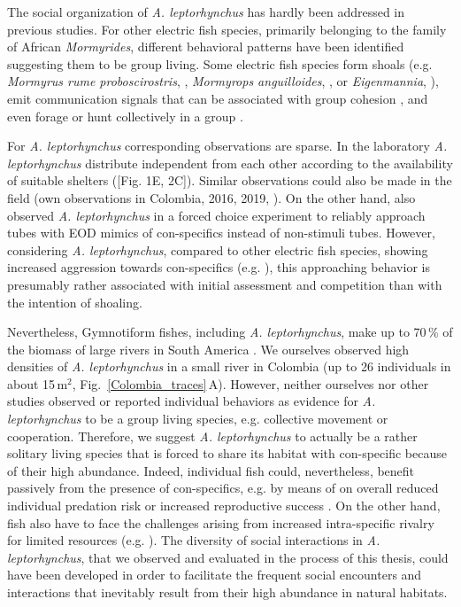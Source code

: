 \documentclass[11pt,pdftex]{article}
\newcommand{\panel}[1]{\textsf{#1}}
\newcommand{\subfref}[2]{\textup{\ref{#1}}\,\panel{#2}}
\newcommand{\fig}{Fig.}
\newcommand{\subfigref}[2]{\fig~\subfref{#1}{#2}}
\newcommand{\note}[2][]{\textcolor{red!80!black}{[\textbf{\ifthenelse{\equal{#1}{}}{}{#1: }}#2]}}
\newcommand{\notetr}[1]{\note[TR]{#1}}
\newcommand{\lepto}{\textit{A. leptorhynchus}}
\newcommand{\Eigenmannia}{\textit{Eigenmannia}}
\begin{document}
The social organization of \lepto{} has hardly been addressed in previous studies. For other electric fish species, primarily belonging to the family of African \textit{Mormyrides}, different behavioral patterns have been identified suggesting them to be group living. Some electric fish species form shoals (e.g. \textit{Mormyrus rume proboscirostris}, \citealp{Worm2021}, \textit{Mormyrops anguilloides}, \citealp{Arnegard2005}, or \Eigenmannia, \citealp{Oestreich2005}), emit communication signals that can be associated with group cohesion \citep{Arnegard2005, Worm2021}, and even forage or hunt collectively in a group \citep{Arnegard2005, Bastos2021}. 

For \lepto{} corresponding observations are sparse. In the laboratory \lepto{} distribute independent from each other according to the availability of suitable shelters (\notetr{Fig. 1E, 2C}). Similar observations could also be made in the field (own observations in Colombia, 2016, 2019, \citealp{Stamper2010}). On the other hand, \citet{Stamper2010} also observed \lepto{} in a forced choice experiment to reliably approach tubes with EOD mimics of con-specifics instead of non-stimuli tubes. However, considering \lepto{}, compared to other electric fish species,  showing increased aggression towards con-specifics (e.g. \citealp{Triefenbach2008}), this approaching behavior is presumably rather associated with initial assessment and competition than with the intention of shoaling. 

Nevertheless, Gymnotiform fishes, including \lepto{}, make up to 70\,\% of the biomass of large rivers in South America \citep{Marrero1991, Cox2004, Crampton2011}. We ourselves observed high densities of \lepto{} in a small river in Colombia (up to 26 individuals in about 15\,m$^2$, \subfigref{Colombia_traces}{A}). However, neither ourselves nor other studies observed or reported individual behaviors as evidence for \lepto{} to be a group living species, e.g. collective movement or cooperation. Therefore, we suggest \lepto{} to actually be a rather solitary living species that is forced to share its habitat with con-specific because of their high abundance. Indeed, individual fish could, nevertheless, benefit passively from the presence of con-specifics, e.g. by means of on overall reduced individual predation risk or increased reproductive success \citep{Cote1995, Clutton-Brock1999, Sword2005, Bilde2007}. On the other hand, fish also have to face the challenges arising from increased intra-specific rivalry for limited resources (e.g. \citealp{Janson1985, Chapman1995, Markham2017}). The diversity of social interactions in \lepto{}, that we observed and evaluated in the process of this thesis, could have been developed in order to facilitate the frequent social encounters and interactions that inevitably result from their high abundance in natural habitats.
\end{document}

